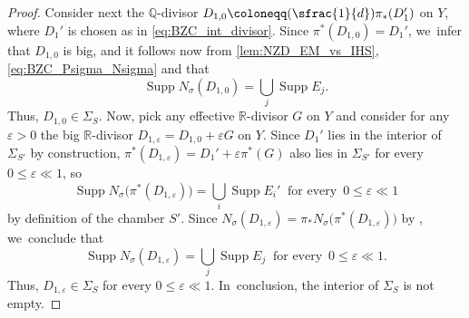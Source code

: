 \documentclass[JEP,XML,SOM,Unicode,published]{cedram}
\newcommand{\Psfrac}[2]{(\sfrac{#1}{#2})}
\theoremstyle{plain}
\theoremstyle{definition}
\newcommand{\Q}{\mathbb{Q}}
\newcommand{\R}{\mathbb{R}}
\DeclareMathOperator{\Supp}{Supp}
\begin{document}
\begin{proof}
Consider next the $\Q$\nobreakdash-divisor $D_{1,0} \coloneqq \Psfrac{1}{d} \pi_* (D_1')$ on $Y$, where $D_1'$ is chosen as in \eqref{eq:BZC_int_divisor}. Since $\pi^* (D_{1,0}) = D_1'$, we~infer that $D_{1,0}$ is big, and it follows now from \autoref{lem:NZD_EM_vs_IHS}, \eqref{eq:BZC_Psigma_Nsigma} and \cite[Th.\,III.5.16]{Nak04book} that
\[
\Supp N_\sigma (D_{1,0}) = \bigcup_j \Supp E_j.
\]
Thus, $D_{1,0} \in \Sigma_S$. Now, pick any effective $\R$\nobreakdash-divisor $G$ on $Y$ and consider for any $\varepsilon > 0$ the big $\R$\nobreakdash-divisor $D_{1,\varepsilon}=D_{1,0} + \varepsilon G$ on $Y$. Since $D_1'$ lies in the interior of $\Sigma_{S'}$ by construction, $\pi^*(D_{1,\varepsilon}) = D_1'+\varepsilon \pi^*(G)$ also lies in $\Sigma_{S'}$ for every $0 \leq \varepsilon \ll 1$, so~\[
\Supp N_\sigma \bigl(\pi^*(D_{1,\varepsilon}) \bigr) = \bigcup_i \Supp E_i' \ \text{ for every } \,0 \leq \varepsilon \ll 1
\]
by definition of the chamber $S'$. Since $N_\sigma (D_{1,\varepsilon}) = \pi_* N_\sigma \bigl(\pi^*(D_{1,\varepsilon}) \bigr)$ by \cite[Th.\,III.5.16]{Nak04book}, we~conclude that
\[
\Supp N_\sigma (D_{1,\varepsilon}) = \bigcup_j \Supp E_j \ \text{ for every } \,0 \leq \varepsilon \ll 1.
\]
Thus, $D_{1,\varepsilon} \in \Sigma_S$ for every $0 \leq \varepsilon \ll 1$. In~conclusion, the interior of $\Sigma_S$ is not empty.
\end{proof}
\end{document}
